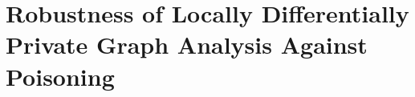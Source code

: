 \graphicspath{{./chapters/chapter4}}

\chapter{Robustness of Locally Differentially Private Graph Analysis Against Poisoning}\label{chap:4}













